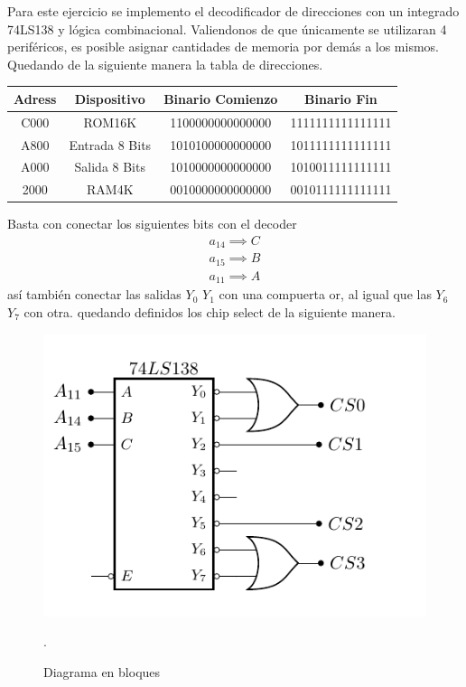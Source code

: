 


Para este ejercicio se implemento el decodificador de direcciones con un integrado 74LS138 y lógica combinacional.
Valiendonos de que únicamente se utilizaran 4 periféricos, es posible asignar cantidades de memoria por demás a los mismos.
Quedando de la siguiente manera la tabla de direcciones.
\begin{table}[H]
\centering
\begin{tabular}{|c|c|c|c|}
\hline
Adress & Dispositivo & Binario Comienzo & Binario Fin \\ \hline
C000 & ROM16K & 1100000000000000 & 1111111111111111 \\ \hline
A800 & Entrada 8 Bits & 1010100000000000 & 1011111111111111 \\ \hline
A000 & Salida 8 Bits & 1010000000000000 & 1010011111111111 \\ \hline
2000 & RAM4K & 0010000000000000 & 0010111111111111 \\ \hline
\end{tabular}
\end{table}
Basta con conectar los siguientes bits con el decoder
\begin{align}
a_{14} \implies C\\
a_{15} \implies B\\
a_{11} \implies A
\end{align}
así también conectar las salidas $Y_0$ $Y_1$  con una compuerta or, al igual que las $Y_6$ $Y_7$ con otra.
quedando definidos los chip select de la siguiente manera.

\begin{figure}[H]
  \centering
  \includegraphics[width=.6\textwidth, page = 1]{ImagenesEjercicio2/Circuits.pdf}
  \caption{Diagrama en bloques}.
  \label{fig:fotofea}
\end{figure}

